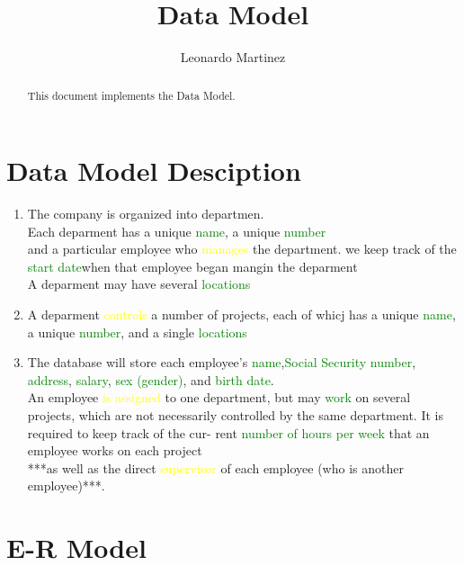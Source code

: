 \documentclass[10pt]{article}         %
\title{Data Model}
\author{Leonardo Martinez}
\begin{document}
\maketitle

\begin{abstract}
This document implements the Data Model.
\end{abstract}

\section{Data Model Desciption}

\begin{enumerate}

\item
The company is organized into departmen.\\
Each deparment has a unique \textcolor{green}{name}, a unique \textcolor{green}{number}\\
and a particular employee who \textcolor{yellow}{manages} the department.
we keep track of the \textcolor{green}{start date}when that employee began mangin the deparment\\
A deparment may have several \textcolor{green}{locations}

\item
A deparment \textcolor{yellow}{controls} a number of projects, each of whicj has a unique \textcolor{green}{name}, a unique \textcolor{green}{number}, and a single \textcolor{green}{locations}

\item
The database will store each employee’s \textcolor{green}{name},\textcolor{green}{Social Security number},\textcolor{green}{
address}, \textcolor{green}{salary}, \textcolor{green}{sex (gender)}, and \textcolor{green}{birth date}. 
\\
An employee \textcolor{yellow}{is assigned} to one
department, but may \textcolor{green}{work} on several projects, which are not necessarily
controlled by the same department. It is required to keep track of the cur-
rent \textcolor{green}{number of hours per week} that an employee works on each project
\\
***as well as the direct \textcolor{yellow}{supervisor} of each employee (who is another employee)***.

\end{enumerate}


\section{E-R Model}
\end{document}
